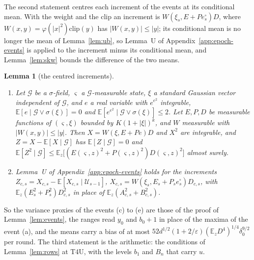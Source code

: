 \documentclass[11pt]{amsart}
\newtheorem{lemma}[theorem]{Lemma}
\theoremstyle{definition}
\numberwithin{equation}{section}
\newcommand{\E}{\mathbb{E}}
\begin{document}
The second statement centres each increment of the events at its conditional mean. With the weight and the clip an increment is $W(\xi_s,E+Pe^\circ_s)D$, where $W(x,y)=\varphi(|x|^2)\mathrm{clip}(y)$ has $|W(x,y)|\le|y|$; its conditional mean is no longer the mean of Lemma~\ref{lem:ub}, so Lemma~U of Appendix~\ref{app:epoch-events} is applied to the increment minus its conditional mean, and Lemma~\ref{lem:skw} bounds the difference of the two means.

\begin{lemma}[the centred increments]\label{lem:centrew}
\begin{enumerate}[label=(\roman*)]
\item Let $\mathcal G$ be a $\sigma$-field, $\varsigma$ a $\mathcal G$-measurable state, $\xi$ a standard Gaussian vector independent of $\mathcal G$, and $e$ a real variable with $e^{e^2}$ integrable, $\E[e\mid\mathcal G\vee\sigma(\xi)]=0$ and $\E[e^{e^2}\mid\mathcal G\vee\sigma(\xi)]\le2$. Let $E,P,D$ be measurable functions of $(\varsigma,\xi)$ bounded by $K(1+|\xi|)^k$, and $W$ measurable with $|W(x,y)|\le|y|$. Then $X=W(\xi,E+Pe)D$ and $X^2$ are integrable, and $Z=X-\E[X\mid\mathcal G]$ has $\E[Z\mid\mathcal G]=0$ and $\E[Z^2\mid\mathcal G]\le\E_z\bigl[(E(\varsigma,z)^2+P(\varsigma,z)^2)D(\varsigma,z)^2\bigr]$ almost surely.
\item Lemma~U of Appendix~\ref{app:epoch-events} holds for the increments $Z_{c,s}=X_{c,s}-\E[X_{c,s}\mid\mathcal U_{s-1}]$, $X_{c,s}=W(\xi_s,E_s+P_se^\circ_s)D_{c,s}$, with $\E_z(E_s^2+P_s^2)D_{c,s}^2$ in place of $\E_z(A_{c,s}^2+B_{c,s}^2)$.
\end{enumerate}
\end{lemma}

So the variance proxies of the events (c) to (e) are those of the proof of Lemma~\ref{lem:events}, the ranges read $y_0$ and $b_0+1$ in place of the maxima of the event (a), and the means carry a bias of at most $52d^{1/2}(1+2/\varepsilon)(\E_zD^4)^{1/4}\delta_0^{9/2}$ per round. The third statement is the arithmetic: the conditions of Lemma~\ref{lem:rows} at T4U, with the levels $b_1$ and $B_n$ that carry $u$.
\end{document}
